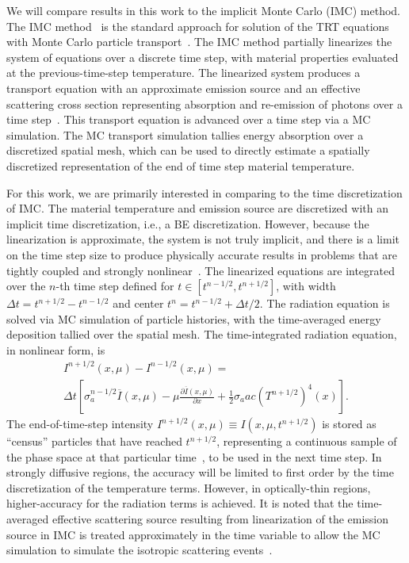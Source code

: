 \documentclass{anstrans}
\newcommand{\pderiv}[2]{\frac{\partial #1}{\partial #2}}
\begin{document}
We will compare results in this work to the implicit Monte Carlo (IMC) method.  The IMC
method~\cite{fnc} is the standard approach for solution of the TRT equations with Monte Carlo particle
transport~\cite{wollaber_review}.  The IMC method partially linearizes the system of equations over
a discrete time step, with material properties evaluated at the previous-time-step temperature. The
linearized system produces a transport equation with an approximate emission source and an effective scattering cross section representing
absorption and re-emission of photons over a time step~\cite{fnc}. This transport equation is advanced over a
time step via a MC simulation.   The MC transport simulation tallies energy absorption over a discretized spatial mesh,
which can be used to directly estimate a spatially discretized representation of the end of time step material temperature.

For this work, we are primarily interested in comparing to the time discretization of IMC.
The material temperature and emission source are discretized with an implicit time discretization,
i.e., a BE discretization.  However, because the linearization is approximate, the system is not
truly implicit, and there is a limit on the time step size to produce physically accurate
results in problems that are tightly coupled and strongly nonlinear~\cite{wollaber2013discrete}. 
The linearized equations are integrated over the $n$-th time step defined for
$t\in[t^{n-1/2},t^{n+1/2}]$, with width $\Delta t=t^{n+1/2}-t^{n-1/2}$ and center $t^{n}=t^{n-1/2} +
\Delta t/2$. The radiation equation is solved via MC simulation of particle histories, with the time-averaged
energy deposition tallied over the spatial mesh.    The time-integrated radiation equation, in nonlinear form, is
\begin{multline}
I^{n+1/2}(x,\mu) - I^{n-1/2}(x,\mu) = \\ \Delta t \left[\sigma_a^{n-1/2} \overline{I}(x,\mu) - {\mu
\pderiv{\overline{I}(x,\mu)}{x}} 
+\frac{1}{2} \sigma_a a c \left(T^{n+1/2}\right)^{4}(x) \right].
\end{multline}
The end-of-time-step intensity $I^{n+1/2}(x,\mu)\equiv I(x,\mu,t^{n+1/2})$ is stored as ``census''
particles that have reached $t^{n+1/2}$,
representing a continuous sample of the phase space at that particular time~\cite{fnc}, to be used in the next
time step.  In strongly diffusive regions, the accuracy will be limited to first
order by the time discretization of the temperature terms.  However, in optically-thin regions, higher-accuracy for the 
radiation terms is achieved.
It is noted that the time-averaged effective scattering source resulting from
linearization of the emission source in IMC is treated approximately in the time variable to allow
the MC simulation to simulate the isotropic scattering events~\cite{wollaber_review,fnc}.
\end{document}
